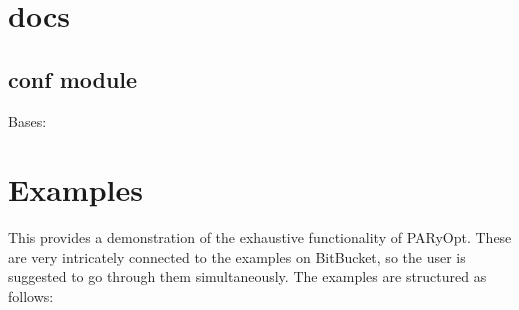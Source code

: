 \documentclass[letterpaper,12pt,english]{sphinxmanual}
\begin{document}
\chapter{docs}
\label{\detokenize{modules:docs}}\label{\detokenize{modules::doc}}

\section{conf module}
\label{\detokenize{conf:module-conf}}\label{\detokenize{conf:conf-module}}\label{\detokenize{conf::doc}}

\begin{fulllineitems}
\label{\detokenize{conf:conf.Mock}}
\sphinxAtStartPar
Bases: 

\end{fulllineitems}



\chapter{Examples}
\label{\detokenize{examples/index:examples}}\label{\detokenize{examples/index::doc}}
\sphinxAtStartPar
This provides a demonstration of the exhaustive functionality of PARyOpt. These are very intricately connected to
the examples on BitBucket, so the user is suggested to go through them simultaneously. The examples are structured as
follows:
\end{document}

